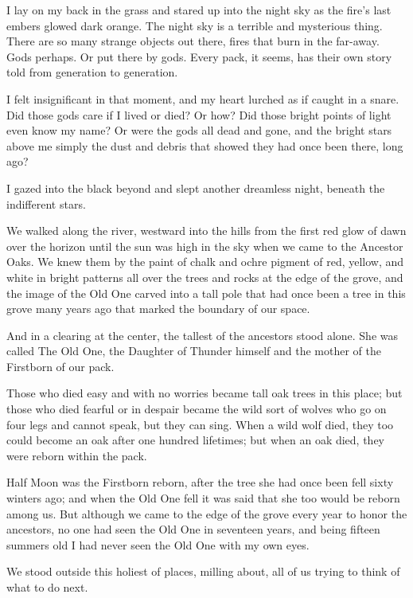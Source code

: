 I lay on my back in the grass and stared up into the night sky as the fire's last embers glowed dark orange. The night sky is a terrible and mysterious thing. There are so many strange objects out there, fires that burn in the far-away. Gods perhaps. Or put there by gods. Every pack, it seems, has their own story told from generation to generation.

I felt insignificant in that moment, and my heart lurched as if caught in a snare. Did those gods care if I lived or died? Or how? Did those bright points of light even know my name? Or were the gods all dead and gone, and the bright stars above me simply the dust and debris that showed they had once been there, long ago?

I gazed into the black beyond and slept another dreamless night, beneath the indifferent stars.

\secdiv

\noindent We walked along the river, westward into the hills from the first red glow of dawn over the horizon until the sun was high in the sky when we came to the Ancestor Oaks. We knew them by the paint of chalk and ochre pigment of red, yellow, and white in bright patterns all over the trees and rocks at the edge of the grove, and the image of the Old One carved into a tall pole that had once been a tree in this grove many years ago that marked the boundary of our space.

And in a clearing at the center, the tallest of the ancestors stood alone. She was called The Old One, the Daughter of Thunder himself and the mother of the Firstborn of our pack.

Those who died easy and with no worries became tall oak trees in this place; but those who died fearful or in despair became the wild sort of wolves who go on four legs and cannot speak, but they can sing. When a wild wolf died, they too could become an oak after one hundred lifetimes; but when an oak died, they were reborn within the pack.

Half Moon was the Firstborn reborn, after the tree she had once been fell sixty winters ago; and when the Old One fell it was said that she too would be reborn among us. But although we came to the edge of the grove every year to honor the ancestors, no one had seen the Old One in seventeen years, and being fifteen summers old I had never seen the Old One with my own eyes.

We stood outside this holiest of places, milling about, all of us trying to think of what to do next.

